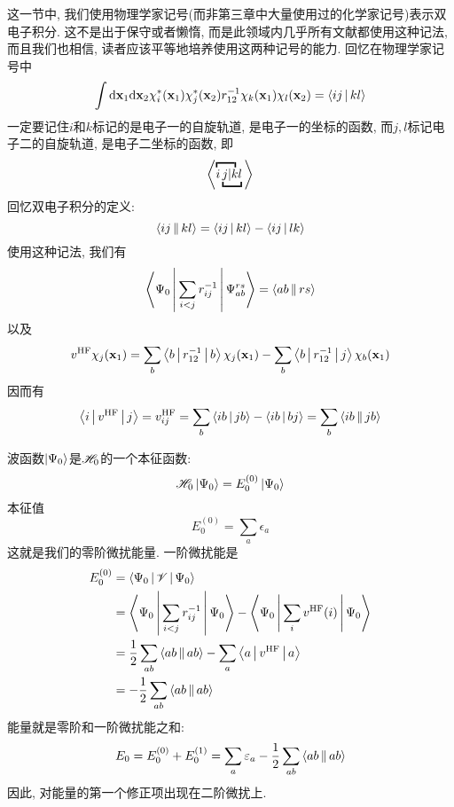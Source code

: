 这一节中, 我们使用物理学家记号(而非第三章中大量使用过的化学家记号)表示双电子积分. 这不是出于保守或者懒惰, 而是此领域内几乎所有文献都使用这种记法, 而且我们也相信, 读者应该平等地培养使用这两种记号的能力. 回忆在物理学家记号中
\begin{equation}
\int\dd{x}_1\dd{x}_2 \chi_i^*(\mathbf{x}_1)\chi_j^*(\mathbf{x}_2)r_{12}^{-1}\chi_k(\mathbf{x}_1)\chi_l(\mathbf{x}_2) = \braket{ij|kl}
\end{equation}
一定要记住$i$和$k$标记的是电子一的自旋轨道, 是电子一的坐标的函数, 而$j,l$标记电子二的自旋轨道, 是电子二坐标的函数, 即
\begin{equation*}
\bigg\langle\lefteqn{\overbracket{\phantom{ij|k}}}i\underbracket{j|kl}\bigg\rangle
\end{equation*}
回忆双电子积分的定义:
\begin{equation}
\Braket{ij||kl}=\Braket{ij|kl}-\Braket{ij|lk}
\end{equation}
使用这种记法, 我们有
\begin{align}
\Braket{\Psi_0|\sum_{i<j}r_{ij}^{-1}|\Psi_{ab}^{rs}} = \Braket{ab||rs}
\end{align}
以及
\begin{align}
v^\mathrm{HF}\chi_j(\mathbf{x}_1)=\sum_b\Braket{b|r_{12}^{-1}|b}\chi_j(\mathbf{x}_1) - \sum_b\Braket{b|r_{12}^{-1}|j}\chi_{b}(\mathbf{x}_1)
\end{align}
因而有
\begin{align}
\Braket{i|v^\mathrm{HF}|j} = v_{ij}^\mathrm{HF} = \sum_{b}\Braket{ib|jb} - \Braket{ib|bj} = \sum_b\Braket{ib||jb}
\end{align}

\hft 波函数$\Ket{\Psi_0}$是$\mathscr{H}_0$的一个本征函数:
\begin{equation}
\mathscr{H}_0\Ket{\Psi_0} = E_0^{(0)}\Ket{\Psi_0}
\end{equation}
本征值
\begin{equation}
E_0^{(0)} = \sum_a\epsilon_a
\end{equation}
这就是我们的零阶微扰能量. 一阶微扰能是
\begin{align}
E_0^{(0)} & = \Braket{\Psi_0|\mathscr{V}|\Psi_0} \notag\\
          & = \Braket{\Psi_0|\sum_{i<j}r_{ij}^{-1}|\Psi_0} - \Braket{\Psi_0|\sum_i v^\mathrm{HF}(i)|\Psi_0} \notag \\
          & = \frac{1}{2}\sum_{ab}\Braket{ab||ab} - \sum_a\Braket{a|v^\mathrm{HF}|a} \notag\\
          & = -\frac{1}{2}\sum_{ab} \Braket{ab||ab}
\end{align}
\hft 能量就是零阶和一阶微扰能之和:
\begin{align}
E_0 = E_0^{(0)} + E_0^{(1)} = \sum_a\varepsilon_a - \frac{1}{2}\sum_{ab}\Braket{ab||ab}
\end{align}
因此, 对\hft 能量的第一个修正项出现在二阶微扰上.

